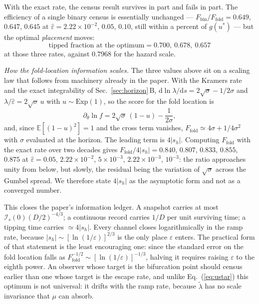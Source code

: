 \documentclass[%
 twocolumn,
 superscriptaddress,
 amsmath,amssymb,
 aps,
 pre,
 floatfix,
]{revtex4-2}
\newcommand{\dd}{\mathrm{d}}
\newcommand{\Ifish}{\mathcal{I}}
\newcommand{\Sig}{\hat\varepsilon}
\newcommand{\E}{\mathbb{E}}
\begin{document}
With the exact rate, the census result survives in part and fails in part.  The efficiency of a single binary census is essentially unchanged --- $F_{\mathrm{bin}}/F_{\mathrm{fold}}=0.649$, $0.647$, $0.645$ at $\Sig=2.22\times10^{-2}$, $0.05$, $0.10$, still within a percent of $g(u^\ast)$ --- but the optimal \emph{placement} moves:
\begin{equation}
\label{eq:foldopt}
\text{tipped fraction at the optimum}=0.700,\ 0.678,\ 0.657
\end{equation}
at those three rates, against $0.7968$ for the hazard scale.

\emph{How the fold-location information scales.}  The three values above sit on a scaling law that follows from machinery already in the paper.  With the Kramers rate and the exact integrability of Sec.~\ref{sec:horizon}\,B, $\dd\ln\lambda/\dd s=2\sqrt\sigma-1/2\sigma$ and $\lambda/\Sig=2\sqrt\sigma\,u$ with $u\sim\mathrm{Exp}(1)$, so the score for the fold location is
\begin{equation}
\label{eq:foldscore}
\partial_\theta\ln f=2\sqrt\sigma\,(1-u)-\frac{1}{2\sigma},
\end{equation}
and, since $\E[(1-u)^2]=1$ and the cross term vanishes, $F_{\mathrm{fold}}\simeq4\sigma+1/4\sigma^2$ with $\sigma$ evaluated at the horizon.  The leading term is $4|s_h|$.  Computing $F_{\mathrm{fold}}$ with the exact rate over two decades gives $F_{\mathrm{fold}}/4|s_h|=0.840$, $0.807$, $0.833$, $0.855$, $0.875$ at $\Sig=0.05$, $2.22\times10^{-2}$, $5\times10^{-3}$, $2.22\times10^{-3}$, $10^{-3}$: the ratio approaches unity from below, but slowly, the residual being the variation of $\sqrt\sigma$ across the Gumbel spread.  We therefore state $4|s_h|$ as the asymptotic form and not as a converged number.

This closes the paper's information ledger.  A snapshot carries at most $\Ifish_s(0)(D/2)^{-4/3}$; a continuous record carries $1/D$ per unit surviving time; a tipping time carries $\simeq4|s_h|$.  Every channel closes logarithmically in the ramp rate, because $|s_h|\sim[\ln(1/\varepsilon)]^{2/3}$ is the only place $\varepsilon$ enters.  The practical form of that statement is the least encouraging one: since the standard error on the fold location falls as $F_{\mathrm{fold}}^{-1/2}\sim[\ln(1/\varepsilon)]^{-1/3}$, halving it requires raising $\varepsilon$ to the eighth power.  An observer whose target is the bifurcation point should census earlier than one whose target is the escape rate, and unlike Eq.~(\ref{eq:ustar}) this optimum is not universal: it drifts with the ramp rate, because $\tilde\lambda$ has no scale invariance that $\mu$ can absorb.
\end{document}
